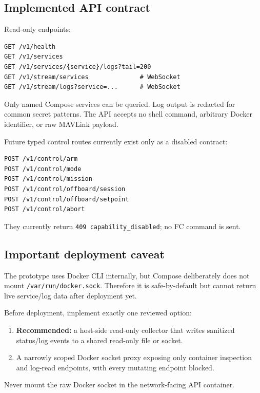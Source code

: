 \documentclass[11pt,a4paper]{article}
\newcommand{\pathtext}[1]{\texttt{#1}}
\begin{document}
\subsection{Implemented API contract}

Read-only endpoints:

\begin{lstlisting}
GET /v1/health
GET /v1/services
GET /v1/services/{service}/logs?tail=200
GET /v1/stream/services              # WebSocket
GET /v1/stream/logs?service=...      # WebSocket
\end{lstlisting}

Only named Compose services can be queried. Log output is redacted for common
secret patterns. The API accepts no shell command, arbitrary Docker identifier,
or raw MAVLink payload.

Future typed control routes currently exist only as a disabled contract:

\begin{lstlisting}
POST /v1/control/arm
POST /v1/control/mode
POST /v1/control/mission
POST /v1/control/offboard/session
POST /v1/control/offboard/setpoint
POST /v1/control/abort
\end{lstlisting}

They currently return \pathtext{409 capability\_disabled}; no FC command is sent.

\subsection{Important deployment caveat}

The prototype uses Docker CLI internally, but Compose deliberately does not
mount \pathtext{/var/run/docker.sock}. Therefore it is safe-by-default but cannot
return live service/log data after deployment yet.

Before deployment, implement exactly one reviewed option:

\begin{enumerate}
  \item \textbf{Recommended:} a host-side read-only collector that writes
        sanitized status/log events to a shared read-only file or socket.
  \item A narrowly scoped Docker socket proxy exposing only container inspection
        and log-read endpoints, with every mutating endpoint blocked.
\end{enumerate}

Never mount the raw Docker socket in the network-facing API container.
\end{document}
